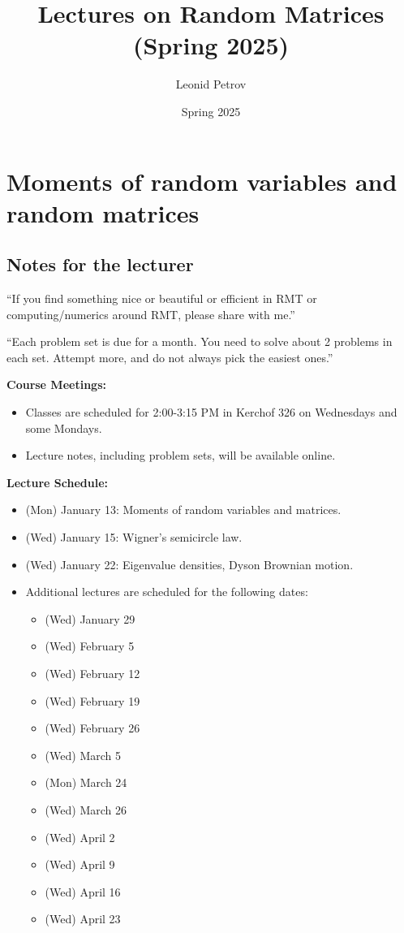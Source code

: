 \documentclass[letterpaper,11pt,oneside,reqno]{book}
\numberwithin{equation}{chapter}  %
\theoremstyle{definition}
\newenvironment{lnotes}{\section*{Notes for the lecturer}}{}
\begin{document}
\title{Lectures on Random Matrices (Spring 2025)}
\author{Leonid Petrov}
\date{Spring 2025}
\maketitle
\tableofcontents

\chapter{Moments of random variables and random
matrices}
\label{chap:lecture1}







\begin{lnotes}

``If you find something nice or beautiful or efficient in
RMT or computing/numerics around RMT, please share with me.''

\medskip

``Each problem set is due for a month.
You need to solve about 2 problems in each set. Attempt more,
and do not always pick the easiest ones.''

\medskip


\textbf{Course Meetings:}
\begin{itemize}
				\item Classes are scheduled for 2:00-3:15 PM in Kerchof 326 on Wednesdays and some Mondays.
				\item Lecture notes, including problem sets, will be available online.
\end{itemize}

\textbf{Lecture Schedule:}
\begin{itemize}
				\item (Mon) January 13: Moments of random variables and matrices.
				\item (Wed) January 15: Wigner's semicircle law.
				\item (Wed) January 22: Eigenvalue densities, Dyson Brownian motion.
				\item Additional lectures are scheduled for the following dates:
				\begin{itemize}
								\item (Wed) January 29
								\item (Wed) February 5
								\item (Wed) February 12
								\item (Wed) February 19
								\item (Wed) February 26
								\item (Wed) March 5
								\item (Mon) March 24
								\item (Wed) March 26
								\item (Wed) April 2
								\item (Wed) April 9
								\item (Wed) April 16
								\item (Wed) April 23
				\end{itemize}
\end{itemize}


\end{lnotes}
\end{document}
